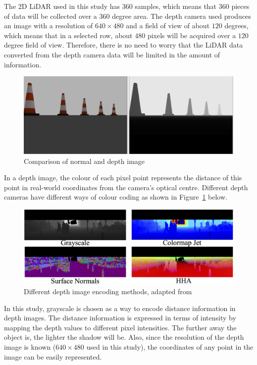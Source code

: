 The 2D LiDAR used in this study has $360$ samples, which means that $360$ pieces of data will be collected over a $360$ degree area. 
The depth camera used produces an image with a resolution of $640\times480$ and a field of view of about $120$ degrees, 
which means that in a selected row, about $480$ pixels will be acquired over a $120$ degree field of view. 
Therefore, there is no need to worry that the LiDAR data converted from the depth camera data will be limited in the amount of information.

\begin{figure}[H]
    \centering
    \includegraphics[width=0.8\linewidth]{figs/comparison.png}
    \caption{Comparison of normal and depth image}
\end{figure}
In a depth image, the colour of each pixel point represents the distance of this point 
in real-world coordinates from the camera's optical centre. 
Different depth cameras have different ways of colour coding as shown in Figure~\ref{fig:depth_encoding} below.
\begin{figure}[H]
    \centering
    \includegraphics[width=1.0\linewidth]{figs/depth_encode.png} %
    \caption{Different depth image encoding methods, adapted from~\cite{depthencode}}
    \label{fig:depth_encoding}
\end{figure}
In this study, grayscale is chosen as a way to encode distance information in depth images. 
The distance information is expressed in terms of intensity by mapping the depth values to different pixel intensities.
The further away the object is, the lighter the shadow will be. 
Also, since the resolution of the depth image is known ($640\times480$ used in this study), the coordinates of any point in the image can be easily represented.
